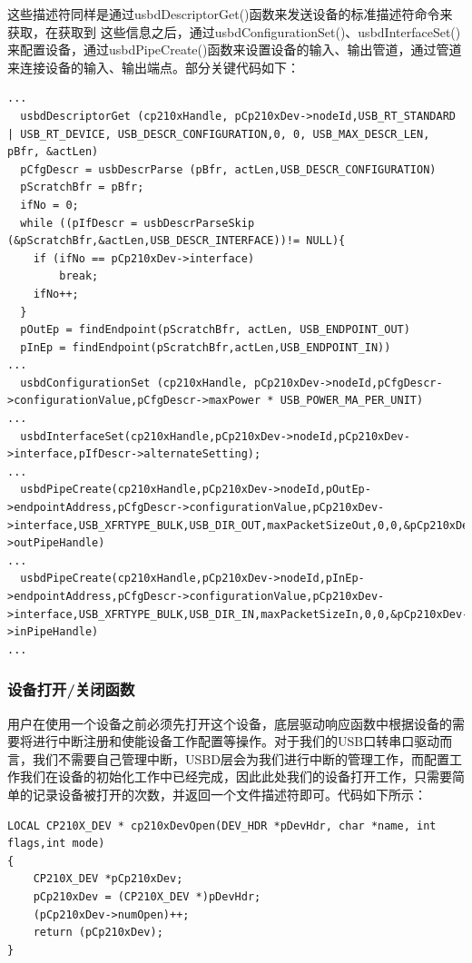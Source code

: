 这些描述符同样是通过usbdDescriptorGet()函数来发送设备的标准描述符命令来获取，在获取到
这些信息之后，通过usbdConfigurationSet()、usbdInterfaceSet()来配置设备，通过usbdPipeCreate()函数来设置设备的输入、输出管道，通过管道来连接设备的输入、输出端点。部分关键代码如下：
\lstset{language=C}
\begin{lstlisting}
...  
  usbdDescriptorGet (cp210xHandle, pCp210xDev->nodeId,USB_RT_STANDARD | USB_RT_DEVICE, USB_DESCR_CONFIGURATION,0, 0, USB_MAX_DESCR_LEN, pBfr, &actLen) 
  pCfgDescr = usbDescrParse (pBfr, actLen,USB_DESCR_CONFIGURATION)
  pScratchBfr = pBfr;
  ifNo = 0;
  while ((pIfDescr = usbDescrParseSkip (&pScratchBfr,&actLen,USB_DESCR_INTERFACE))!= NULL){
    if (ifNo == pCp210xDev->interface)
		break;
	ifNo++;
  }
  pOutEp = findEndpoint(pScratchBfr, actLen, USB_ENDPOINT_OUT)
  pInEp = findEndpoint(pScratchBfr,actLen,USB_ENDPOINT_IN))
...  
  usbdConfigurationSet (cp210xHandle, pCp210xDev->nodeId,pCfgDescr->configurationValue,pCfgDescr->maxPower * USB_POWER_MA_PER_UNIT)
...  
  usbdInterfaceSet(cp210xHandle,pCp210xDev->nodeId,pCp210xDev->interface,pIfDescr->alternateSetting);
...  
  usbdPipeCreate(cp210xHandle,pCp210xDev->nodeId,pOutEp->endpointAddress,pCfgDescr->configurationValue,pCp210xDev->interface,USB_XFRTYPE_BULK,USB_DIR_OUT,maxPacketSizeOut,0,0,&pCp210xDev->outPipeHandle)
...  
  usbdPipeCreate(cp210xHandle,pCp210xDev->nodeId,pInEp->endpointAddress,pCfgDescr->configurationValue,pCp210xDev->interface,USB_XFRTYPE_BULK,USB_DIR_IN,maxPacketSizeIn,0,0,&pCp210xDev->inPipeHandle)
...
\end{lstlisting}


\subsubsection{设备打开/关闭函数}

	用户在使用一个设备之前必须先打开这个设备，底层驱动响应函数中根据设备的需要将进行中断注册和使能设备工作配置等操作。对于我们的USB口转串口驱动而言，我们不需要自己管理中断，USBD层会为我们进行中断的管理工作，而配置工作我们在设备的初始化工作中已经完成，因此此处我们的设备打开工作，只需要简单的记录设备被打开的次数，并返回一个文件描述符即可。代码如下所示：
	
\lstset{language=C}
\begin{lstlisting}
LOCAL CP210X_DEV * cp210xDevOpen(DEV_HDR *pDevHdr, char *name, int flags,int mode)
{
	CP210X_DEV *pCp210xDev;
	pCp210xDev = (CP210X_DEV *)pDevHdr;
	(pCp210xDev->numOpen)++;
	return (pCp210xDev);
}
\end{lstlisting}

